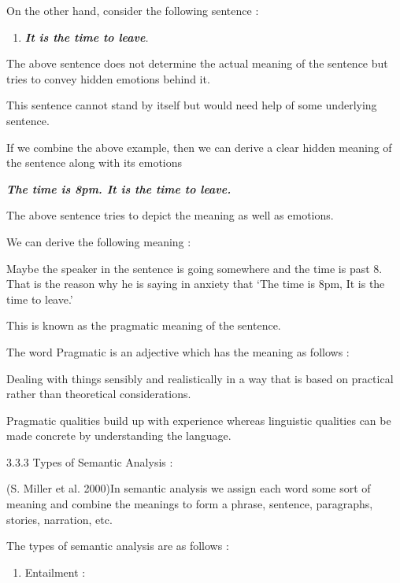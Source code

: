 \documentclass{article} %
\begin{document}
\noindent On the other hand, consider the following sentence :

\begin{enumerate}
\item  \textbf{\textit{It is the time to leave}}\textit{.}
\end{enumerate}

\noindent The above sentence does not determine the actual meaning of the sentence but tries to convey hidden emotions behind it.

\noindent This sentence cannot stand by itself but would need help of some underlying sentence. 

\noindent If we combine the above example, then we can derive a clear hidden meaning of the sentence along with its emotions

\noindent \textbf{\textit{The time is 8pm. It is the time to leave.}}

\noindent The above sentence tries to depict the meaning as well as emotions.

\noindent We can derive the following meaning :

\noindent Maybe the speaker in the sentence is going somewhere and the time is past 8. That is the reason why he is saying in anxiety that `The time is 8pm, It is the time to leave.'

\noindent This is known as the pragmatic meaning of the sentence.

\noindent The word Pragmatic is an adjective which has the meaning as follows :

\noindent Dealing with things sensibly and realistically in a way that is based on practical rather than theoretical considerations.

\noindent Pragmatic qualities build up with experience whereas linguistic qualities can be made concrete by understanding the language.

\noindent 

\noindent 

3.3.3 Types of Semantic Analysis : 

(S. Miller et al. 2000)In semantic analysis we assign each word some sort of meaning and combine the meanings to form a phrase, sentence, paragraphs, stories, narration, etc.

The types of semantic analysis are as follows :

\begin{enumerate}
\item  Entailment :
\end{enumerate}
\end{document}
